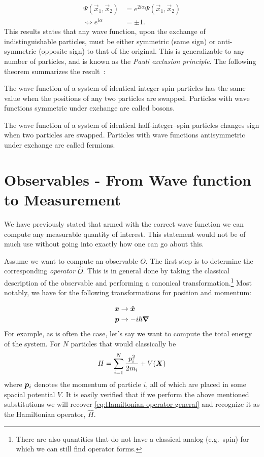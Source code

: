\documentclass[Thesis.tex]{subfiles}
\begin{document}
\begin{align}
    \Psi(\vec x_1,\vec x_2) &= e^{2i\alpha}\Psi(\vec x_1, \vec x_2)\\
    \iff e^{i\alpha} &= \pm 1.
\end{align}
This results states that any wave function, upon the exchange of
indistinguishable particles, must be either symmetric (same sign) or
anti-symmetric (opposite sign) to that of the original. This is generalizable to
any number of particles, and is known as the \emph{Pauli exclusion principle}.
The following theorem summarizes the result~\cite{PhysRev-58-716}:

\begin{theorem}\label{theorem:spin-statistic}

    The wave function of a system of identical integer-spin particles has the same value
    when the positions of any two particles are swapped. Particles with wave functions
    symmetric under exchange are called bosons.

    The wave function of a system of identical half-integer–spin particles changes sign
    when two particles are swapped. Particles with wave functions antisymmetric under
    exchange are called fermions.
\end{theorem}

\section{Observables - From Wave function to Measurement}

We have previously stated that armed with the correct wave function we can compute any
measurable quantity of interest. This statement would not be of much use without going
into exactly how one can go about this.

Assume we want to compute an observable $O$. The first step is to determine the
corresponding \emph{operator} $\hat O$. This is in general done by taking the classical
description of the observable and performing a canonical transformation.\footnote{There are
also quantities that do not have a classical analog (e.g.\ spin) for which we can still
find operator forms.} Most notably, we have for the following transformations for
position and momentum:

\begin{align}
    \bm{x} &\rightarrow \hat{\bm{x}}\\
    \bm{p} &\rightarrow -i\hbar\grad
\end{align}
For example, as is often the case, let's say we want to compute the total energy of the
system. For $N$ particles that would classically be
\begin{align}
    H = \sum_{i=1}^N \frac{p_i^2}{2m_i} + V(\bm{X})
\end{align}
where $\bm{p}_i$ denotes the momentum of particle $i$, all of which are placed in some
spacial potential $V$. It is easily verified that if we perform the above mentioned
substitutions we will recover \autoref{eq:Hamiltonian-operator-general} and recognize
it as the Hamiltonian operator, $\hat H$.
\end{document}
